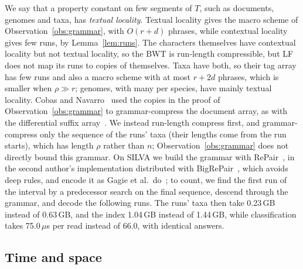 We say that a property constant on few segments of $T$, such as documents, genomes and taxa, has \emph{textual locality}.
Textual locality gives the macro scheme of Observation~\ref{obs:grammar}, with $O(r + d)$ phrases, while contextual locality gives few runs, by Lemma~\ref{lem:runs}.
The characters themselves have contextual locality but not textual locality, so the BWT is run-length compressible, but LF does not map its runs to copies of themselves.
Taxa have both, so their tag array has few runs and also a macro scheme with at most $r + 2d$ phrases, which is smaller when $\rho \gg r$; genomes, with many per species, have mainly textual locality.
Cobas and Navarro~\cite{CN19} used the copies in the proof of Observation~\ref{obs:grammar} to grammar-compress the document array, as with the differential suffix array~\cite{GN07,GagieNavarroPrezza2020}.
We instead run-length compress first, and grammar-compress only the sequence of the runs' taxa (their lengths come from the run starts), which has length $\rho$ rather than $n$; Observation~\ref{obs:grammar} does not directly bound this grammar.
On SILVA we build the grammar with RePair~\cite{LM00}, in the second author's implementation distributed with BigRePair~\cite{GIM+19}, which avoids deep rules, and encode it as Gagie et al.\ do~\cite{GIM+20}; to count, we find the first run of the interval by a predecessor search on the final sequence, descend through the grammar, and decode the following runs.
The runs' taxa then take 0.23\,GB instead of 0.63\,GB, and the index 1.04\,GB instead of 1.44\,GB, while classification takes 75.0\,$\mu$s per read instead of 66.0, with identical answers.

\subsection{Time and space}
\label{sec:tradeoffs}


